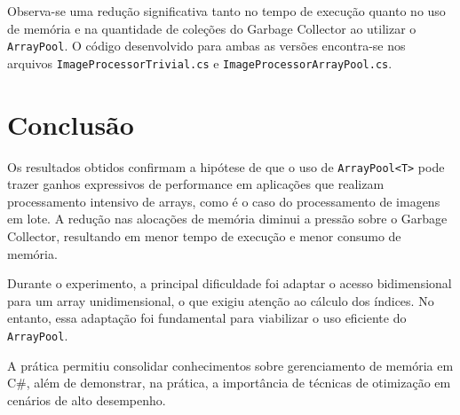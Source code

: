 \documentclass[
	12pt,
	oneside,
	a4paper,
	english,
	brazil,
	]{abntex2}
\begin{document}
{Observa-se uma redução significativa tanto no tempo de execução quanto no uso de memória e na quantidade de coleções do Garbage Collector ao utilizar o \texttt{ArrayPool}. O código desenvolvido para ambas as versões encontra-se nos arquivos \texttt{ImageProcessorTrivial.cs} e \texttt{ImageProcessorArrayPool.cs}.

\section{Conclusão}

Os resultados obtidos confirmam a hipótese de que o uso de \texttt{ArrayPool<T>} pode trazer ganhos expressivos de performance em aplicações que realizam processamento intensivo de arrays, como é o caso do processamento de imagens em lote. A redução nas alocações de memória diminui a pressão sobre o Garbage Collector, resultando em menor tempo de execução e menor consumo de memória.

Durante o experimento, a principal dificuldade foi adaptar o acesso bidimensional para um array unidimensional, o que exigiu atenção ao cálculo dos índices. No entanto, essa adaptação foi fundamental para viabilizar o uso eficiente do \texttt{ArrayPool}.

A prática permitiu consolidar conhecimentos sobre gerenciamento de memória em C#, além de demonstrar, na prática, a importância de técnicas de otimização em cenários de alto desempenho.

}
\end{document}
